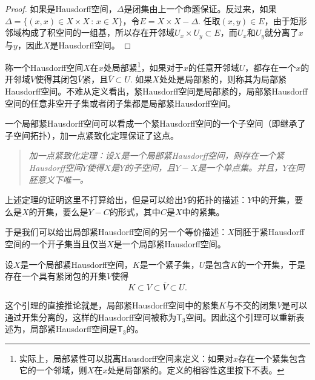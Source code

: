 \begin{proof}
如果是Hausdorff空间，$\Delta$是闭集由上一个命题保证。反过来，如果$\Delta=\{(x,x)\in X\times X\,:\, x\in X\}$，令$E=X\times X-\Delta$. 任取$(x,y)\in E$，由于矩形邻域构成了积空间的一组基，所以存在开邻域$U_x\times U_y\subset E$，而$U_x$和$U_y$就分离了$x$与$y$，因此$X$是Hausdorff空间。
\end{proof}

\begin{para}[局部紧Hausdorff空间]
称一个Hausdorff空间$X$在$x$处局部紧\footnote{实际上，局部紧性可以脱离Hausdorff空间来定义：如果对$x$存在一个紧集包含它的一个邻域，则$X$在$x$处是局部紧的。定义的相容性这里按下不表。}，如果对于$x$的任意开邻域$U$，都存在一个$x$的开邻域$V$使得其闭包$\overline{V}$紧，且$\overline{V}\subset U$. 如果$X$处处是局部紧的，则称其为局部紧Hausdorff空间。不难从定义看出，紧Hausdorff空间是局部紧的，局部紧Hausdorff空间的任意非空开子集或者闭子集都是局部紧Hausdorff空间。

一个局部紧Hausdorff空间可以看成一个紧Hausdorff空间的一个子空间（即继承了子空间拓扑），加一点紧致化定理保证了这点。
\begin{quote}\it
	加一点紧致化定理：设$X$是一个局部紧Hausdorff空间，则存在一个紧Hausdorff空间$Y$使得$X$是$Y$的子空间，且$Y-X$是一个单点集。并且，$Y$在同胚意义下唯一。
\end{quote}
上述定理的证明这里不打算给出，但是可以给出$Y$的拓扑的描述：$Y$中的开集，要么是$X$的开集，要么是$Y-C$的形式，其中$C$是$X$中的紧集。

于是我们可以给出局部紧Hausdorff空间的另一个等价描述：$X$同胚于紧Hausdorff空间的一个开子集当且仅当$X$是一个局部紧Hausdorff空间。
\end{para}

\begin{lem}
设$X$是一个局部紧Hausdorff空间，$K$是一个紧子集，$U$是包含$K$的一个开集，于是存在一个具有紧闭包的开集$V$使得
\[
	K\subset V\subset \overline{V}\subset U.
\]
\end{lem}

这个引理的直接推论就是，局部紧Hausdorff空间中的紧集$K$与不交的闭集$V$是可以通过开集分离的，这样的Hausdorff空间被称为$\mathsf{T}_3$空间。因此这个引理可以重新表述为，局部紧Hausdorff空间是$\mathsf{T}_3$的。

